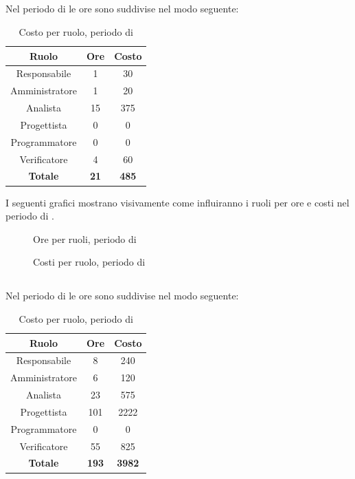 \subsection{\AD}
Nel periodo di \AD{} le ore sono suddivise nel modo seguente:
\begin{table}[H]
	\centering
	\begin{tabular}{|c|c|c|}
		\hline
		\textbf{Ruolo} &
		\textbf{Ore} &
		\textbf{Costo} \\
		\hline
		Responsabile & 1 & 30\\
		\hline
		Amministratore & 1 & 20\\
		\hline
		Analista & 15 & 375\\
		\hline
		Progettista & 0 & 0 \\
		\hline
		Programmatore & 0 & 0 \\
		\hline
		Verificatore & 4 & 60\\
		\hline
		\textbf{Totale} & \textbf{21} & \textbf{485} \\
		\hline
	\end{tabular}
	\caption{Costo per ruolo, periodo di \AD}
\end{table}

I seguenti grafici mostrano visivamente come influiranno i ruoli per ore e costi nel periodo di \AD.
\begin{figure}[H]
	\centering
	\caption{Ore per ruoli, periodo di \AD}
\end{figure}
\begin{figure}[H]
	\centering
	\caption{Costi per ruolo, periodo di \AD}
\end{figure}

\subsection{\PA}
Nel periodo di \PA{} le ore sono suddivise nel modo seguente:
\begin{table}[H]
	\centering
	\begin{tabular}{|c|c|c|}
		\hline
		\textbf{Ruolo} &
		\textbf{Ore} &
		\textbf{Costo} \\
		\hline
		Responsabile & 8 & 240\\
		\hline
		Amministratore & 6 & 120\\
		\hline
		Analista & 23 & 575\\
		\hline
		Progettista & 101 & 2222 \\
		\hline
		Programmatore & 0 & 0 \\
		\hline
		Verificatore & 55 & 825\\
		\hline
		\textbf{Totale} & \textbf{193} & \textbf{3982} \\
		\hline
	\end{tabular}
	\caption{Costo per ruolo, periodo di \PA}
\end{table}

